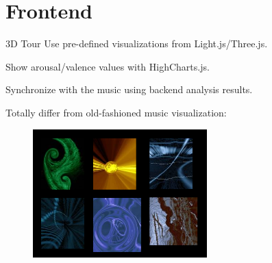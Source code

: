 \section{Frontend}
\begin{frame}{3D Tour}
     Use pre-defined visualizations from Light.js/Three.js.

     Show arousal/valence values with HighCharts.js.

     Synchronize with the music using backend analysis results.

Totally differ from old-fashioned music visualization:
\begin{figure}[H]
  \centering
  \includegraphics[width=0.6\textwidth]{res/out.png}
\end{figure}

\end{frame}

